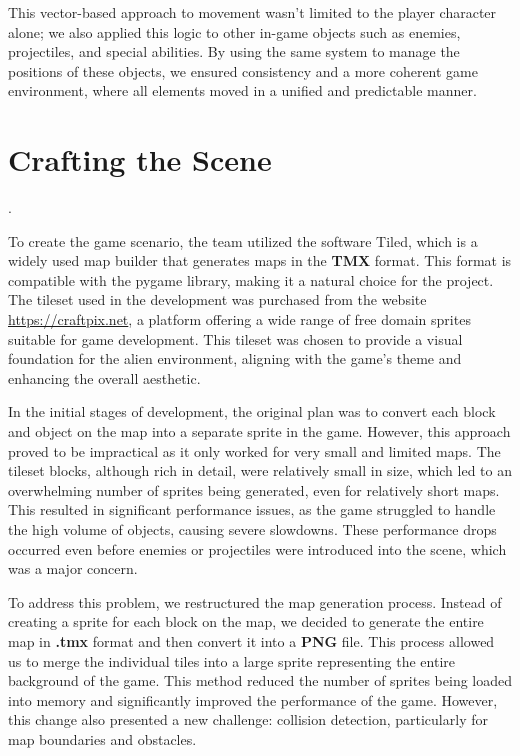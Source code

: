 \documentclass[a4paper,12pt]{article}
\begin{document}
This vector-based approach to movement wasn’t limited to the player character alone; we also applied this logic to other in-game objects such as enemies, projectiles, and special abilities. By using the same system to manage the positions of these objects, we ensured consistency and a more coherent game environment, where all elements moved in a unified and predictable manner.

\section*{Crafting the Scene}
.

To create the game scenario, the team utilized the software Tiled, which is a widely used map builder that generates maps in the \textbf{TMX} format. This format is compatible with the pygame library, making it a natural choice for the project. The tileset used in the development was purchased from the website \href{https://craftpix.net}{https://craftpix.net}, a platform offering a wide range of free domain sprites suitable for game development. This tileset was chosen to provide a visual foundation for the alien environment, aligning with the game's theme and enhancing the overall aesthetic.

In the initial stages of development, the original plan was to convert each block and object on the map into a separate sprite in the game. However, this approach proved to be impractical as it only worked for very small and limited maps. The tileset blocks, although rich in detail, were relatively small in size, which led to an overwhelming number of sprites being generated, even for relatively short maps. This resulted in significant performance issues, as the game struggled to handle the high volume of objects, causing severe slowdowns. These performance drops occurred even before enemies or projectiles were introduced into the scene, which was a major concern.

To address this problem, we restructured the map generation process. Instead of creating a sprite for each block on the map, we decided to generate the entire map in \textbf{.tmx} format and then convert it into a \textbf{PNG} file. This process allowed us to merge the individual tiles into a large sprite representing the entire background of the game. This method reduced the number of sprites being loaded into memory and significantly improved the performance of the game. However, this change also presented a new challenge: collision detection, particularly for map boundaries and obstacles.
\end{document}
